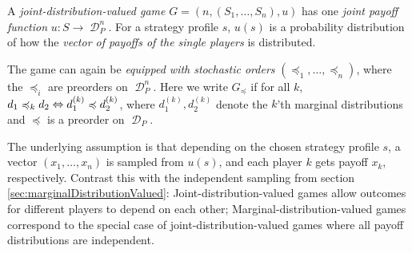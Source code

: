 \documentclass[a4paper]{scrreprt}
\DeclareMathOperator{\D}{\mathcal{D}}
\DeclareMathOperator{\releq}{\;=\;}
\begin{document}
    \begin{defn}
        A \emph{joint-distribution-valued game} $G = (n, (S_1, \dots, S_n), u)$
        has one \emph{joint payoff function} $u: S \to \D_P^n$.
        For a strategy profile $s$, $u(s)$ is a probability distribution of how the \emph{vector of payoffs of the single players} is distributed.

        The game can again be \emph{equipped with stochastic orders} $(\preccurlyeq_1, \dots, \preccurlyeq_n)$, where the $\preccurlyeq_i$ are preorders on $\D_P^n$.
        Here we write $G_\preccurlyeq$ if for all $k$, $d_1 \preccurlyeq_k d_2 \Leftrightarrow d_1^{(k)} \preccurlyeq d_2^{(k)}$, where $d_1^{(k)}, d_2^{(k)}$ denote the $k$'th marginal distributions and $\preccurlyeq$ is a preorder on $\D_P$.
        
        
    \end{defn}
    The underlying assumption is that depending on the chosen strategy profile $s$, a vector $(x_1, \dots, x_n)$ is sampled from $u(s)$, and each player $k$ gets payoff $x_k$, respectively.
    Contrast this with the independent sampling from section \ref{sec:marginalDistributionValued}:
    Joint-distribution-valued games allow outcomes for different players to depend on each other;
    Marginal-distribution-valued games correspond to the special case of joint-distribution-valued games where all payoff distributions are independent.
    
    
    
\end{document}
